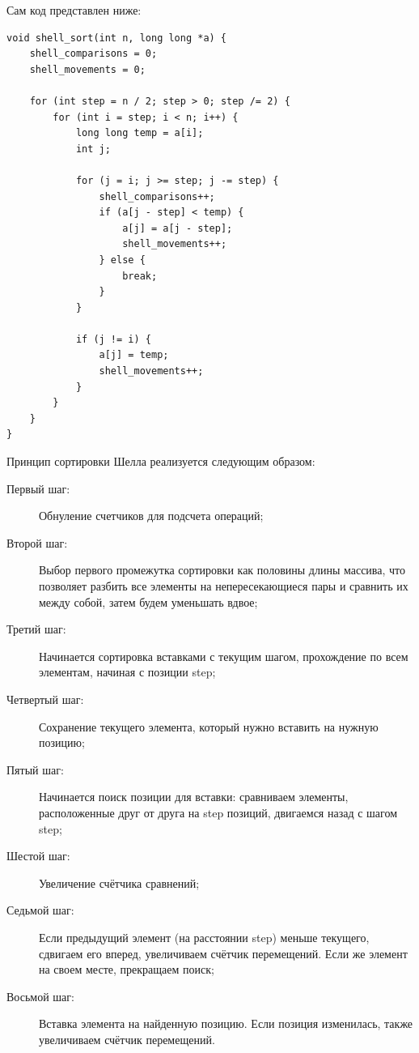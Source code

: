 \documentclass[a4paper,12pt,titlepage,finall]{article}
\begin{document}
Сам код представлен ниже:

\begin{verbatim}
void shell_sort(int n, long long *a) {
    shell_comparisons = 0;
    shell_movements = 0;
    
    for (int step = n / 2; step > 0; step /= 2) {
        for (int i = step; i < n; i++) {
            long long temp = a[i];
            int j;
            
            for (j = i; j >= step; j -= step) {
                shell_comparisons++;
                if (a[j - step] < temp) {
                    a[j] = a[j - step];
                    shell_movements++;
                } else {
                    break;
                }
            }
            
            if (j != i) {
                a[j] = temp;
                shell_movements++;
            }
        }
    }
}

\end{verbatim}

Принцип сортировки Шелла реализуется следующим образом:

\begin{description}
\item[Первый шаг:] Обнуление счетчиков для подсчета операций;

\item[Второй шаг:] Выбор первого промежутка сортировки как половины длины массива, что позволяет разбить все элементы на непересекающиеся пары и сравнить их между собой, затем будем уменьшать вдвое;

\item[Третий шаг:] Начинается сортировка вставками с текущим шагом, прохождение по всем элементам, начиная с позиции step;

\item[Четвертый шаг:] Сохранение текущего элемента, который нужно вставить на нужную позицию;

\item[Пятый шаг:] Начинается поиск позиции для вставки: сравниваем элементы, расположенные друг от друга на step позиций, двигаемся назад с шагом step;

\item[Шестой шаг:] Увеличение счётчика сравнений;

\item[Седьмой шаг:] Если предыдущий элемент (на расстоянии step) меньше текущего, сдвигаем его вперед, увеличиваем счётчик перемещений. Если же элемент на своем месте, прекращаем поиск;

\item[Восьмой шаг:] Вставка элемента на найденную позицию. Если позиция изменилась, также увеличиваем счётчик перемещений.

\end{description}
\end{document}
